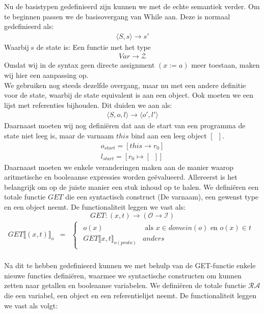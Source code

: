 \documentclass[12pt]{article}
\newcommand{\RA}{\mathcal{RA}}
\begin{document}
Nu de basistypen gedefinieerd zijn kunnen we met de echte semantiek verder. Om te beginnen passen we de basisovergang van While aan. Deze is normaal gedefinieerd als:
\begin{gather*}
 \langle S,s \rangle \rightarrow s\prime 
\end{gather*}
Waarbij s de state is: Een functie met het type
\begin{gather*}
Var \rightarrow \mathcal{Z}
\end{gather*}
Omdat wij in de syntax geen directe assignment $(x := a)$ meer toestaan, maken wij hier een aanpassing op.\\
We gebruiken nog steeds dezelfde overgang, maar nu met een andere definitie voor de state, waarbij de state equivalent is aan een object. Ook moeten we een lijst met referenties bijhouden. Dit duiden we aan als:
\begin{gather*}
 \langle S,o,l \rangle \rightarrow \langle o\prime, l\prime \rangle 
\end{gather*}
Daarnaast moeten wij nog definiëren dat aan de start van een programma de state niet leeg is, maar de varnaam $ this $ bind aan een leeg object $ [\enspace] $.
\begin{gather*}
o_{start} = [this \rightarrow r_0]\\	
l_{start} = [r_0 \mapsto [ \enspace ]]
\end{gather*}
Daarnaast moeten we enkele veranderingen maken aan de manier waarop aritmetische en booleaanse expressies worden geëvalueerd. 
Allereerst is het belangrijk om op de juiste manier een stuk inhoud op te halen. We definiëren een totale functie $GET$ die een syntactisch construct (De varnaam), een gewenst type en een object neemt. De functionaliteit leggen we vast als:
\[ GET: (x,t) \rightarrow (\mathcal{O} \rightarrow \mathcal{I}) \]
\[
\begin{matrix}
GET\llbracket (x,t) \rrbracket_o & = & 
\begin{cases}
\begin{matrix}
o(x) & \mbox{ als } x \in domein(o) \mbox{ en } o(x) \in t\\
GET\llbracket x,t \rrbracket_{o(proto)} & anders
\end{matrix}
\end{cases}\\
\end{matrix}
\]

Na dit te hebben gedefinieerd kunnen we met behulp van de GET-functie enkele nieuwe functies definiëren, waarmee we syntactische constructen om kunnen zetten naar getallen en booleaanse variabelen. We definiëren de totale functie $ \RA $ die een variabel, een object en een referentielijst neemt. De functionaliteit leggen we vast als volgt:
\end{document}
